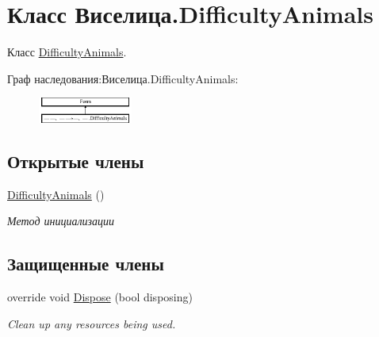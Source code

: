 \hypertarget{class_xD0_x92_xD0_xB8_xD1_x81_xD0_xB5_xD0_xBB_xD0_xB8_xD1_x86_xD0_xB0_1_1_difficulty_animals}{\section{Класс Виселица.\+Difficulty\+Animals}
\label{class_xD0_x92_xD0_xB8_xD1_x81_xD0_xB5_xD0_xBB_xD0_xB8_xD1_x86_xD0_xB0_1_1_difficulty_animals}
}


Класс \hyperlink{class_xD0_x92_xD0_xB8_xD1_x81_xD0_xB5_xD0_xBB_xD0_xB8_xD1_x86_xD0_xB0_1_1_difficulty_animals}{Difficulty\+Animals}.  


Граф наследования\+:Виселица.\+Difficulty\+Animals\+:\begin{figure}[H]
\begin{center}
\leavevmode
\includegraphics[height=0.836445cm]{class_xD0_x92_xD0_xB8_xD1_x81_xD0_xB5_xD0_xBB_xD0_xB8_xD1_x86_xD0_xB0_1_1_difficulty_animals}
\end{center}
\end{figure}
\subsection*{Открытые члены}
\begin{DoxyCompactItemize}
\item 
\hyperlink{class_xD0_x92_xD0_xB8_xD1_x81_xD0_xB5_xD0_xBB_xD0_xB8_xD1_x86_xD0_xB0_1_1_difficulty_animals_a769edad5749483357109afa1045927ae}{Difficulty\+Animals} ()
\begin{DoxyCompactList}\small\item\em Метод инициализации \end{DoxyCompactList}\end{DoxyCompactItemize}
\subsection*{Защищенные члены}
\begin{DoxyCompactItemize}
\item 
override void \hyperlink{class_xD0_x92_xD0_xB8_xD1_x81_xD0_xB5_xD0_xBB_xD0_xB8_xD1_x86_xD0_xB0_1_1_difficulty_animals_a0a7b1c96dcc7a9745d2b0a61970de7ce}{Dispose} (bool disposing)
\begin{DoxyCompactList}\small\item\em Clean up any resources being used. \end{DoxyCompactList}\end{DoxyCompactItemize}


